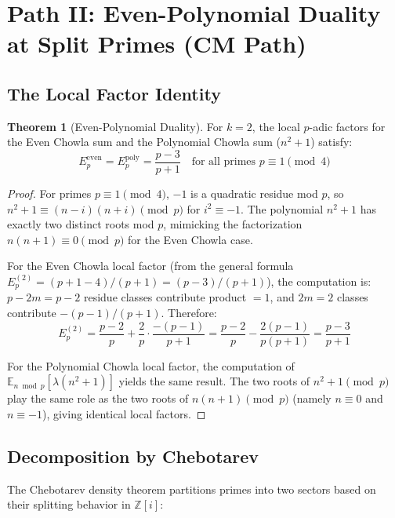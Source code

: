 \documentclass[11pt,a4paper]{article}
\theoremstyle{definition}
\newtheorem{theorem}{Theorem}[section]
\begin{document}
\section{Path II: Even-Polynomial Duality at Split Primes (CM Path)}

\subsection{The Local Factor Identity}

\begin{theorem}[Even-Polynomial Duality]
\label{thm:ep-duality}
For $k = 2$, the local $p$-adic factors for the Even Chowla sum and the Polynomial Chowla sum ($n^2+1$) satisfy:
\begin{equation}
E_p^{\mathrm{even}} = E_p^{\mathrm{poly}} = \frac{p-3}{p+1} \quad \text{for all primes } p \equiv 1 \pmod{4}
\end{equation}
\end{theorem}

\begin{proof}
For primes $p \equiv 1 \pmod{4}$, $-1$ is a quadratic residue mod $p$, so $n^2+1 \equiv (n-i)(n+i) \pmod{p}$ for $i^2 \equiv -1$. The polynomial $n^2+1$ has exactly two distinct roots mod $p$, mimicking the factorization $n(n+1) \equiv 0 \pmod{p}$ for the Even Chowla case.

For the Even Chowla local factor (from the general formula $E_p^{(2)} = (p+1-4)/(p+1) = (p-3)/(p+1)$), the computation is: $p - 2m = p - 2$ residue classes contribute product $= 1$, and $2m = 2$ classes contribute $-(p-1)/(p+1)$. Therefore:
\begin{equation}
E_p^{(2)} = \frac{p-2}{p} + \frac{2}{p} \cdot \frac{-(p-1)}{p+1} = \frac{p-2}{p} - \frac{2(p-1)}{p(p+1)} = \frac{p-3}{p+1}
\end{equation}

For the Polynomial Chowla local factor, the computation of $\mathbb{E}_{n \bmod p}[\lambda(n^2+1)]$ yields the same result. The two roots of $n^2+1 \pmod{p}$ play the same role as the two roots of $n(n+1) \pmod{p}$ (namely $n \equiv 0$ and $n \equiv -1$), giving identical local factors.
\end{proof}

\subsection{Decomposition by Chebotarev}

The Chebotarev density theorem partitions primes into two sectors based on their splitting behavior in $\mathbb{Z}[i]$:
\end{document}
